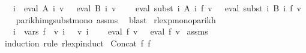 \begin{isabellebody}
\ \ \ {\isachardoublequoteopen}{\isasymforall}i{\isachardot}{\kern0pt}\ {\isasymPsi}\ {\isacharparenleft}{\kern0pt}eval\ {\isacharparenleft}{\kern0pt}A\ i{\isacharparenright}{\kern0pt}\ v{\isacharparenright}{\kern0pt}\ {\isacharequal}{\kern0pt}\ {\isasymPsi}\ {\isacharparenleft}{\kern0pt}eval\ {\isacharparenleft}{\kern0pt}B\ i{\isacharparenright}{\kern0pt}\ v{\isacharparenright}{\kern0pt}{\isachardoublequoteclose}\isanewline
\ \ \ {\isachardoublequoteopen}{\isasymPsi}\ {\isacharparenleft}{\kern0pt}eval\ {\isacharparenleft}{\kern0pt}subst\ {\isacharparenleft}{\kern0pt}{\isasymlambda}i{\isachardot}{\kern0pt}\ A\ i{\isacharparenright}{\kern0pt}\ f{\isacharparenright}{\kern0pt}\ v{\isacharparenright}{\kern0pt}\ {\isacharequal}{\kern0pt}\ {\isasymPsi}\ {\isacharparenleft}{\kern0pt}eval\ {\isacharparenleft}{\kern0pt}subst\ {\isacharparenleft}{\kern0pt}{\isasymlambda}i{\isachardot}{\kern0pt}\ B\ i{\isacharparenright}{\kern0pt}\ f{\isacharparenright}{\kern0pt}\ v{\isacharparenright}{\kern0pt}{\isachardoublequoteclose}\isanewline
%
\isadelimproof
\ \ %
\endisadelimproof
%
\isatagproof
{}\isamarkupfalse%
\ parikh{\isacharunderscore}{\kern0pt}img{\isacharunderscore}{\kern0pt}subst{\isacharunderscore}{\kern0pt}mono\ assms\ \isamarkupfalse%
\ blast%
\endisatagproof
{\isafoldproof}%
%
\isadelimproof
\isanewline
%
\endisadelimproof
\isanewline
\isanewline
{}\isamarkupfalse%
\ rlexp{\isacharunderscore}{\kern0pt}mono{\isacharunderscore}{\kern0pt}parikh{\isacharcolon}{\kern0pt}\isanewline
\ \ \ {\isachardoublequoteopen}{\isasymforall}i\ {\isasymin}\ vars\ f{\isachardot}{\kern0pt}\ {\isasymPsi}\ {\isacharparenleft}{\kern0pt}v\ i{\isacharparenright}{\kern0pt}\ {\isasymsubseteq}\ {\isasymPsi}\ {\isacharparenleft}{\kern0pt}v{\isacharprime}{\kern0pt}\ i{\isacharparenright}{\kern0pt}{\isachardoublequoteclose}\isanewline
\ \ \ {\isachardoublequoteopen}{\isasymPsi}\ {\isacharparenleft}{\kern0pt}eval\ f\ v{\isacharparenright}{\kern0pt}\ {\isasymsubseteq}\ {\isasymPsi}\ {\isacharparenleft}{\kern0pt}eval\ f\ v{\isacharprime}{\kern0pt}{\isacharparenright}{\kern0pt}{\isachardoublequoteclose}\isanewline
%
\isadelimproof
%
\endisadelimproof
%
\isatagproof
{}\isamarkupfalse%
\ assms\ \isamarkupfalse%
\ {\isacharparenleft}{\kern0pt}induction\ rule{\isacharcolon}{\kern0pt}\ rlexp{\isachardot}{\kern0pt}induct{\isacharparenright}{\kern0pt}\isanewline
{}\isamarkupfalse%
\ {\isacharparenleft}{\kern0pt}Concat\ f{}\ f{}{\isacharparenright}{\kern0pt}\isanewline

\end{isabellebody}
